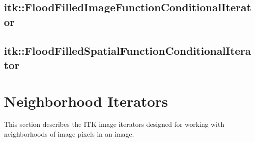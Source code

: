 
%

\subsection{itk::FloodFilledImageFunctionConditionalIterator}
\label{itk::FloodFilledImageFunctionConditionalIterator}


\subsection{itk::FloodFilledSpatialFunctionConditionalIterator}
\label{itk::FloodFilledSpatialFunctionConditionalIterator}


\section{Neighborhood Iterators}
\label{sec:NeighborhoodIterators}
This section describes the ITK image iterators designed for working with
neighborhoods of image pixels in an image. 
% 



